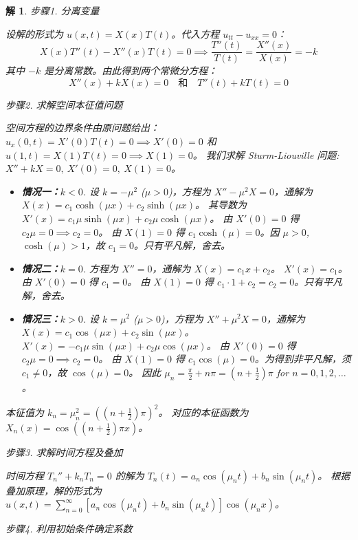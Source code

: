 \documentclass[12pt,a4paper]{article}
\numberwithin{subsection}{section}   %
\numberwithin{subsubsection}{subsection}
\theoremstyle{plain}
\newtheorem{solution}{解}[subsection]  %
\theoremstyle{definition}
\theoremstyle{remark}
\theoremstyle{remark}
\begin{document}
	\begin{solution}
		步骤1. 分离变量
		
		\noindent
		设解的形式为 $u(x,t) = X(x)T(t)$。代入方程 $u_{tt} - u_{xx} = 0$：
		\[ X(x)T''(t) - X''(x)T(t) = 0 \implies \frac{T''(t)}{T(t)} = \frac{X''(x)}{X(x)} = -k \]
		其中 $-k$ 是分离常数。由此得到两个常微分方程：
		\[ X''(x) + k X(x) = 0 \quad \text{和} \quad T''(t) + k T(t) = 0 \]
		
		步骤2. 求解空间本征值问题
		
		\noindent
		空间方程的边界条件由原问题给出：$u_x(0,t) = X'(0)T(t)=0 \implies X'(0)=0$ 和 $u(1,t)=X(1)T(t)=0 \implies X(1)=0$。
		我们求解 Sturm-Liouville 问题: $X'' + k X = 0, \ X'(0)=0, \ X(1)=0$。
		
		\begin{itemize}
			\item \textbf{情况一：$k < 0$}.
			设 $k = -\mu^2$ ($\mu>0$)，方程为 $X'' - \mu^2 X = 0$，通解为 $X(x) = c_1 \cosh(\mu x) + c_2 \sinh(\mu x)$。
			其导数为 $X'(x) = c_1\mu\sinh(\mu x) + c_2\mu\cosh(\mu x)$。
			由 $X'(0)=0$ 得 $c_2\mu=0 \implies c_2=0$。
			由 $X(1)=0$ 得 $c_1 \cosh(\mu) = 0$。因 $\mu>0$, $\cosh(\mu) > 1$，故 $c_1=0$。只有平凡解，舍去。
			
			\item \textbf{情况二：$k = 0$}.
			方程为 $X''=0$，通解为 $X(x) = c_1 x + c_2$。
			$X'(x) = c_1$。由 $X'(0)=0$ 得 $c_1=0$。
			由 $X(1)=0$ 得 $c_1 \cdot 1 + c_2 = c_2 = 0$。只有平凡解，舍去。
			
			\item \textbf{情况三：$k > 0$}.
			设 $k = \mu^2$ ($\mu>0$)，方程为 $X'' + \mu^2 X = 0$，通解为 $X(x) = c_1 \cos(\mu x) + c_2 \sin(\mu x)$。
			$X'(x) = -c_1\mu\sin(\mu x) + c_2\mu\cos(\mu x)$。
			由 $X'(0)=0$ 得 $c_2\mu=0 \implies c_2=0$。
			由 $X(1)=0$ 得 $c_1 \cos(\mu) = 0$。为得到非平凡解，须 $c_1 \neq 0$，故 $\cos(\mu)=0$。
			因此 $\mu_n = \frac{\pi}{2} + n\pi = (n+\frac{1}{2})\pi$ for $n=0, 1, 2, \dots$。
		\end{itemize}
		本征值为 $k_n = \mu_n^2 = ((n+\frac{1}{2})\pi)^2$。
		对应的本征函数为 $X_n(x) = \cos\left((n+\frac{1}{2})\pi x\right)$。
		
	步骤3. 求解时间方程及叠加
		
		\noindent
		时间方程 $T_n'' + k_n T_n = 0$ 的解为 $T_n(t) = a_n \cos(\mu_n t) + b_n \sin(\mu_n t)$。
		根据叠加原理，解的形式为 $u(x,t) = \sum_{n=0}^\infty \left[a_n \cos(\mu_n t) + b_n \sin(\mu_n t)\right] \cos(\mu_n x)$。
		
	步骤4. 利用初始条件确定系数
		

\end{solution}
\end{document}
